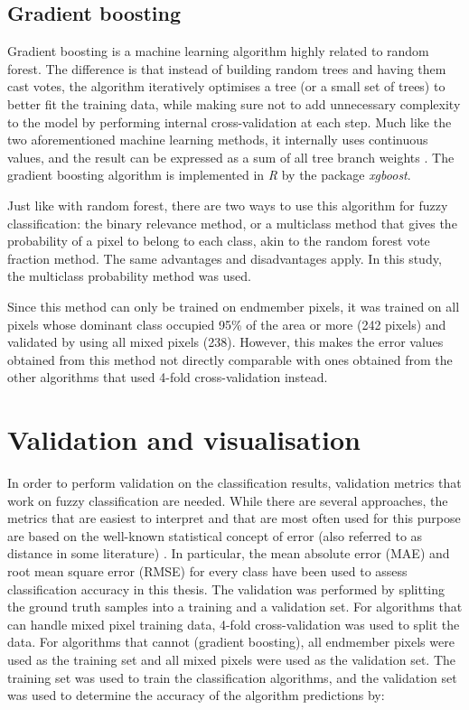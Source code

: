 \documentclass[a4paper,10pt]{book}
\begin{document}
\subsection{Gradient boosting}

Gradient boosting is a machine learning algorithm highly related to random forest. The difference is that instead of building random trees and having them cast votes, the algorithm iteratively optimises a tree (or a small set of trees) to better fit the training data, while making sure not to add unnecessary complexity to the model by performing internal cross-validation at each step. Much like the two aforementioned machine learning methods, it internally uses continuous values, and the result can be expressed as a sum of all tree branch weights \citep{friedman2001gradientboost}. The gradient boosting algorithm is implemented in \textit{R} by the package \textit{xgboost}.

Just like with random forest, there are two ways to use this algorithm for fuzzy classification: the binary relevance method, or a multiclass method that gives the probability of a pixel to belong to each class, akin to the random forest vote fraction method. The same advantages and disadvantages apply. In this study, the multiclass probability method was used.

Since this method can only be trained on endmember pixels, it was trained on all pixels whose dominant class occupied 95\% of the area or more (242 pixels) and validated by using all mixed pixels (238). However, this makes the error values obtained from this method not directly comparable with ones obtained from the other algorithms that used 4-fold cross-validation instead.

\section{Validation and visualisation}

In order to perform validation on the classification results, validation metrics that work on fuzzy classification are needed. While there are several approaches, the metrics that are easiest to interpret and that are most often used for this purpose are based on the well-known statistical concept of error (also referred to as distance in some literature) \citep{foody1996fuzzyevaluation}. In particular, the mean absolute error (MAE) and root mean square error (RMSE) for every class have been used to assess classification accuracy in this thesis. The validation was performed by splitting the ground truth samples into a training and a validation set. For algorithms that can handle mixed pixel training data, 4-fold cross-validation was used to split the data. For algorithms that cannot (gradient boosting), all endmember pixels were used as the training set and all mixed pixels were used as the validation set. The training set was used to train the classification algorithms, and the validation set was used to determine the accuracy of the algorithm predictions by:
\end{document}
